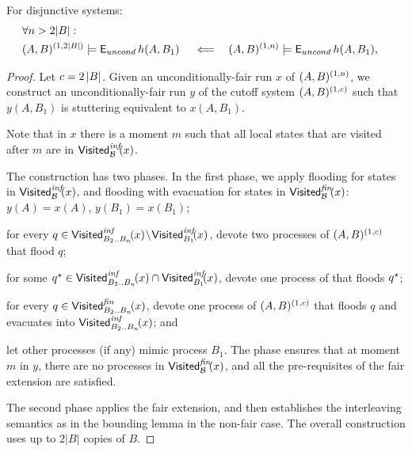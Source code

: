 \begin{lemma} \label{disj:le:FairDisjunctiveBounding}
For disjunctive systems:
\begin{align*}
&\forall n>2|B|: \\
&(A,B)^{(1,2|B|)} \models \operatorname{\mathsf{E}}_{uncond} h(A,B_1) &
&\impliedby& &
(A,B)^{(1,n)} \models \operatorname{\mathsf{E}}_{uncond} h(A,B_1),\\
\end{align*}
% 
\end{lemma}
\begin{proof}
Let $c=2\left| {B} \right|$. 
Given an unconditionally-fair run $x$ of $(A,B)^{(1,n)}$,
we construct an unconditionally-fair run $y$ of the cutoff system $(A,B)^{(1,c)}$ 
such that $y(A,B_1)$ is stuttering equivalent to $x(A,B_1)$.

Note that in $x$ there is a moment $m$ such that all local states that are visited after $m$ are in $\mathsf{Visited}^{\textit{inf}}_{\mathcal{B}}\!(x)$.

The construction has two phases. In the first phase, we apply flooding for states in $\mathsf{Visited}^{\textit{inf}}_{\mathcal{B}}\!(x)$, and flooding with evacuation for states in $\mathsf{Visited}^{\textit{fin}}_{\mathcal{B}}\!(x)$:
\li
\-[(a)] $y(A)=x(A)$, $y(B_1)=x(B_1)$;

\-[(b)] for every $q \in \mathsf{Visited}^{\textit{inf}}_{B_2..B_n}\!(x) \!\setminus\! \mathsf{Visited}^{\textit{inf}}_{B_1}\!(x)$, 
       devote two processes of $(A,B)^{(1,c)}$ that flood $q$;

\-[(c)] for some ${q^\star} \in \mathsf{Visited}^{\textit{inf}}_{B_2..B_n}\!(x) \cap \mathsf{Visited}^{\textit{inf}}_{B_1}\!(x)$,
       devote one process of \cutoffsys that floods ${q^\star}$;

\-[(d)] for every $q \in \mathsf{Visited}^{\textit{fin}}_{B_2..B_n}\!(x)$, 
       devote one process of $(A,B)^{(1,c)}$ that 
       floods $q$ and evacuates into $\mathsf{Visited}^{\textit{inf}}_{B_2..B_n}\!(x)$;
       and

\-[(e)] let other processes (if any) mimic process $B_1$.
\il
The phase ensures that at moment $m$ in $y$, 
there are no processes in $\mathsf{Visited}^{\textit{fin}}_{\mathcal{B}}\!(x)$, 
and all the pre-requisites of the fair extension are satisfied.

The second phase applies the fair extension, 
and then establishes the interleaving semantics 
as in the bounding lemma in the non-fair case.
The overall construction uses up to $2|B|$ copies of $B$.
\end{proof}

